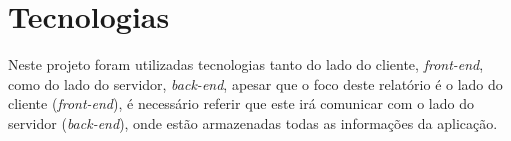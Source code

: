 \chapter{Tecnologias}

Neste projeto foram utilizadas tecnologias tanto do lado do cliente, \textit{front-end}, como do lado do servidor, \textit{back-end}, apesar que o foco deste relatório é o lado do cliente (\textit{front-end}), é necessário referir que este irá comunicar com o lado do servidor (\textit{back-end}), onde estão armazenadas todas as informações da aplicação.





